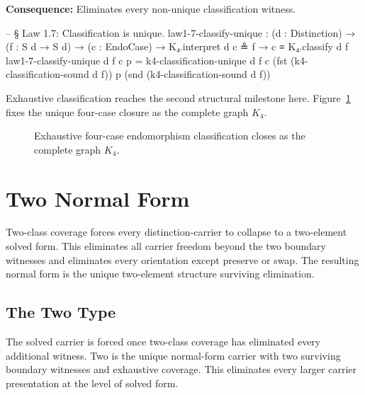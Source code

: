 \documentclass[11pt,a4paper]{book}
\def\texttt#1{#1}%
\begin{document}
\textbf{Consequence:} Eliminates every non-unique classification witness.

\begin{code}
-- § Law 1.7: Classification is unique.
law1-7-classify-unique :
  (d : Distinction) →
  (f : S d → S d) →
  (c : EndoCase) →
  K₄.interpret d c ≗ f →
  c ≡ K₄.classify d f
law1-7-classify-unique d f c p =
  k4-classification-unique d f c (fst (k4-classification-sound d f)) p (snd (k4-classification-sound d f))
\end{code}

Exhaustive classification reaches the second structural milestone here. Figure~\ref{fig:k4-classification} fixes the unique four-case closure as the complete graph $K_4$.

\begin{figure}[h]
\centering
{}
\caption{Exhaustive four-case endomorphism classification closes as the complete graph $K_4$.}
\label{fig:k4-classification}
\end{figure}

\chapter{Two Normal Form}

Two-class coverage forces every distinction-carrier to collapse to a two-element solved form.
This eliminates all carrier freedom beyond the two boundary witnesses and eliminates every orientation except preserve or swap.
The resulting normal form is the unique two-element structure surviving elimination.

\section{The Two Type}

The solved carrier is forced once two-class coverage has eliminated every additional witness.
\texttt{Two} is the unique normal-form carrier with two surviving boundary witnesses and exhaustive coverage.
This eliminates every larger carrier presentation at the level of solved form.
\end{document}

